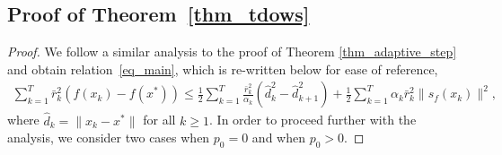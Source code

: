 \documentclass{article}
\theoremstyle{plain}
\theoremstyle{definition}
\theoremstyle{remark}
\begin{document}

\subsection{Proof of Theorem~\ref{thm_tdows}}\label{thm_tdows_proof}
\begin{proof}
    We follow a similar analysis to the proof of Theorem \ref{thm_adaptive_step} and obtain relation~\eqref{eq_main}, which is re-written below for ease of reference,
    \begin{align}
    \sum_{k=1}^{T} \bar{r}_k^2 \left( f(x_k) - f(x^*) \right)
    \leq \frac{1}{2} \sum_{k=1}^{T} \frac{\bar{r}_k^2}{\alpha_k} \left(\hat d_k^2 - \hat d_{k+1}^2 \right)
    + \frac{1}{2} \sum_{k=1}^{T} \alpha_k \bar{r}_k^2 \| s_f(x_k) \|^2 , \label{eq_main_tdows}
\end{align}
where $\hat d_k = \|x_k - x^*\|$ for all $k \geq 1$. In order to proceed further with the analysis, we consider two cases when $p_0 = 0$ and when $p_0 > 0$.


\end{proof}
\end{document}
